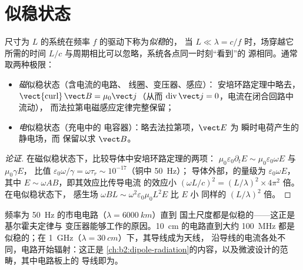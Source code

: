 \section{似稳状态}

\begin{definition}[似稳近似]\label{def:b2:maxwell-equations:arqs}
尺寸为 $L$ 的系统在频率 $f$ 的驱动下称为\emph{似稳}的，
当 $L \ll \lambda = c/f$ 时，场穿越它所需的时间 $L/c$
与周期相比可以忽略，系统各点同一时刻“看到”的
源相同。通常取两种极限：
\begin{itemize}
  \item \emph{磁}似稳状态（含电流的电路、
        线圈、变压器、感应）：
        安培环路定理中略去，$\operatorname{\vect{curl}}\vect B
        = \mu_0\vect j$（从而 $\operatorname{div}\vect j = 0$，电流在闭合回路中流动），
        而法拉第电磁感应定律完整保留；
  \item \emph{电}似稳状态（充电中的
        电容器）：略去法拉第项，$\vect E$ 为
        瞬时电荷产生的静电场，而
        保留以求 $\vect B$。
\end{itemize}
\end{definition}

\begin{proof}[论证]
在磁似稳状态下，比较导体中安培环路定理的两项：
$\mu_0\varepsilon_0\partial_t E \sim \mu_0\varepsilon_0\omega E$ 与 $\mu_0\gamma E$，
比值 $\varepsilon_0\omega/\gamma = \omega\tau_r \sim 10^{-17}$（铜中 \qty{50}{Hz}）；
导体外部，的量级为
$\varepsilon_0\omega E$，其中 $E \sim \omega AB$，即其效应比传导电流
的效应小 $(\omega L/c)^2 = (L/\lambda)^2 \times 4\pi^2$ 倍。在电似稳状态下，
感生场 $\omega BL \sim \omega^2\varepsilon_0\mu_0L^2E$ 比 $E$ 小
同样的 $(L/\lambda)^2$ 倍。
\end{proof}

\begin{example}[电路与天线]\label{ex:b2:maxwell-equations:sizes}
频率为 \qty{50}{Hz} 的市电电路（$\lambda = \qty{6000}{km}$）直到
国土尺度都是似稳的——这正是基尔霍夫定律与
变压器能够工作的原因。\qty{10}{cm} 的电路直到大约
\qty{100}{MHz} 都是似稳的；在 \qty{1}{GHz}（$\lambda = \qty{30}{cm}$）下，其导线成为天线，
沿导线的电流各处不同，电路开始辐射：这正是
\cref{ch:b2:dipole-radiation}的内容，以及微波设计的范畴，其中电路板上的
导线即为。
\end{example}


